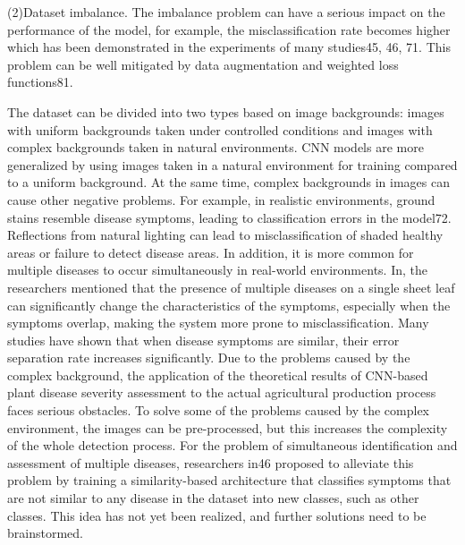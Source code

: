 (2)Dataset imbalance. The imbalance problem can have a serious impact on the performance of the model, for example, the misclassification rate becomes higher which has been demonstrated in the experiments of many studies45, 46, 71. This problem can be well mitigated by data augmentation and weighted loss functions81.

The dataset can be divided into two types based on image backgrounds: images with uniform backgrounds taken under controlled conditions and images with complex backgrounds taken in natural environments. CNN models are more generalized by using images taken in a natural environment for training compared to a uniform background. At the same time, complex backgrounds in images can cause other negative problems. For example, in realistic environments, ground stains resemble disease symptoms, leading to classification errors in the model72. Reflections from natural lighting can lead to misclassification of shaded healthy areas or failure to detect disease areas. In addition, it is more common for multiple diseases to occur simultaneously in real-world environments. In, the researchers mentioned that the presence of multiple diseases on a single sheet leaf can significantly change the characteristics of the symptoms, especially when the symptoms overlap, making the system more prone to misclassification. Many studies have shown that when disease symptoms are similar, their error separation rate increases significantly. Due to the problems caused by the complex background, the application of the theoretical results of CNN-based plant disease severity assessment to the actual agricultural production process faces serious obstacles. To solve some of the problems caused by the complex environment, the images can be pre-processed, but this increases the complexity of the whole detection process. For the problem of simultaneous identification and assessment of multiple diseases, researchers in46 proposed to alleviate this problem by training a similarity-based architecture that classifies symptoms that are not similar to any disease in the dataset into new classes, such as other classes. This idea has not yet been realized, and further solutions need to be brainstormed.

